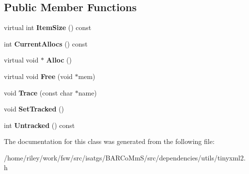 \subsection*{Public Member Functions}
\begin{DoxyCompactItemize}
\item 
virtual int {\bfseries Item\+Size} () const \hypertarget{classtinyxml2_1_1_mem_pool_t_a7ec8778fe99f6e332615a703be0b48bc}{}\label{classtinyxml2_1_1_mem_pool_t_a7ec8778fe99f6e332615a703be0b48bc}

\item 
int {\bfseries Current\+Allocs} () const \hypertarget{classtinyxml2_1_1_mem_pool_t_a56be11b7db6a7ef00db17088a7769aab}{}\label{classtinyxml2_1_1_mem_pool_t_a56be11b7db6a7ef00db17088a7769aab}

\item 
virtual void $\ast$ {\bfseries Alloc} ()\hypertarget{classtinyxml2_1_1_mem_pool_t_aa9d785a48ffe6ea1be679bab13464486}{}\label{classtinyxml2_1_1_mem_pool_t_aa9d785a48ffe6ea1be679bab13464486}

\item 
virtual void {\bfseries Free} (void $\ast$mem)\hypertarget{classtinyxml2_1_1_mem_pool_t_a4f1a0c434e9e3d7391e5c16ed4ee8c70}{}\label{classtinyxml2_1_1_mem_pool_t_a4f1a0c434e9e3d7391e5c16ed4ee8c70}

\item 
void {\bfseries Trace} (const char $\ast$name)\hypertarget{classtinyxml2_1_1_mem_pool_t_a0bc596f271e0f139822c534238b3f244}{}\label{classtinyxml2_1_1_mem_pool_t_a0bc596f271e0f139822c534238b3f244}

\item 
void {\bfseries Set\+Tracked} ()\hypertarget{classtinyxml2_1_1_mem_pool_t_a7798932414916199a1bc0f9c3f368521}{}\label{classtinyxml2_1_1_mem_pool_t_a7798932414916199a1bc0f9c3f368521}

\item 
int {\bfseries Untracked} () const \hypertarget{classtinyxml2_1_1_mem_pool_t_a524b90d0edeac41964c06510757dce0f}{}\label{classtinyxml2_1_1_mem_pool_t_a524b90d0edeac41964c06510757dce0f}

\end{DoxyCompactItemize}


The documentation for this class was generated from the following file\+:\begin{DoxyCompactItemize}
\item 
/home/riley/work/fsw/src/isatgs/\+B\+A\+R\+Co\+Mm\+S/src/dependencies/utils/tinyxml2.\+h\end{DoxyCompactItemize}
